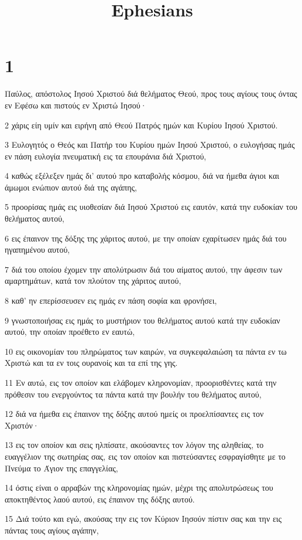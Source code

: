 

\title{Ephesians}


\chapter{1}

\par Παύλος, απόστολος Ιησού Χριστού διά θελήματος Θεού, προς τους αγίους τους όντας εν Εφέσω και πιστούς εν Χριστώ Ιησού·
\par 2 χάρις είη υμίν και ειρήνη από Θεού Πατρός ημών και Κυρίου Ιησού Χριστού.
\par 3 Ευλογητός ο Θεός και Πατήρ του Κυρίου ημών Ιησού Χριστού, ο ευλογήσας ημάς εν πάση ευλογία πνευματική εις τα επουράνια διά Χριστού,
\par 4 καθώς εξέλεξεν ημάς δι' αυτού προ καταβολής κόσμου, διά να ήμεθα άγιοι και άμωμοι ενώπιον αυτού διά της αγάπης,
\par 5 προορίσας ημάς εις υιοθεσίαν διά Ιησού Χριστού εις εαυτόν, κατά την ευδοκίαν του θελήματος αυτού,
\par 6 εις έπαινον της δόξης της χάριτος αυτού, με την οποίαν εχαρίτωσεν ημάς διά του ηγαπημένου αυτού,
\par 7 διά του οποίου έχομεν την απολύτρωσιν διά του αίματος αυτού, την άφεσιν των αμαρτημάτων, κατά τον πλούτον της χάριτος αυτού,
\par 8 καθ' ην επερίσσευσεν εις ημάς εν πάση σοφία και φρονήσει,
\par 9 γνωστοποιήσας εις ημάς το μυστήριον του θελήματος αυτού κατά την ευδοκίαν αυτού, την οποίαν προέθετο εν εαυτώ,
\par 10 εις οικονομίαν του πληρώματος των καιρών, να συγκεφαλαιώση τα πάντα εν τω Χριστώ και τα εν τοις ουρανοίς και τα επί της γης.
\par 11 Εν αυτώ, εις τον οποίον και ελάβομεν κληρονομίαν, προορισθέντες κατά την πρόθεσιν του ενεργούντος τα πάντα κατά την βουλήν του θελήματος αυτού,
\par 12 διά να ήμεθα εις έπαινον της δόξης αυτού ημείς οι προελπίσαντες εις τον Χριστόν·
\par 13 εις τον οποίον και σεις ηλπίσατε, ακούσαντες τον λόγον της αληθείας, το ευαγγέλιον της σωτηρίας σας, εις τον οποίον και πιστεύσαντες εσφραγίσθητε με το Πνεύμα το Άγιον της επαγγελίας,
\par 14 όστις είναι ο αρραβών της κληρονομίας ημών, μέχρι της απολυτρώσεως του αποκτηθέντος λαού αυτού, εις έπαινον της δόξης αυτού.
\par 15 Διά τούτο και εγώ, ακούσας την εις τον Κύριον Ιησούν πίστιν σας και την εις πάντας τους αγίους αγάπην,
